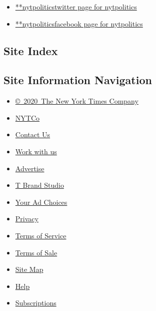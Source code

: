\begin{itemize}
\tightlist
\item
  \href{https://twitter.com/nytpolitics}{**nytpoliticstwitter page for
  nytpolitics}
\item
  \href{https://www.facebookcorewwwi.onion/nytpolitics}{**nytpoliticsfacebook
  page for nytpolitics}
\end{itemize}

\hypertarget{site-index}{%
\subsection{Site Index}\label{site-index}}

\hypertarget{site-information-navigation}{%
\subsection{Site Information
Navigation}\label{site-information-navigation}}

\begin{itemize}
\tightlist
\item
  \href{https://help.nytimes3xbfgragh.onion/hc/en-us/articles/115014792127-Copyright-notice}{©~2020~The
  New York Times Company}
\end{itemize}

\begin{itemize}
\tightlist
\item
  \href{https://www.nytco.com/}{NYTCo}
\item
  \href{https://help.nytimes3xbfgragh.onion/hc/en-us/articles/115015385887-Contact-Us}{Contact
  Us}
\item
  \href{https://www.nytco.com/careers/}{Work with us}
\item
  \href{https://nytmediakit.com/}{Advertise}
\item
  \href{http://www.tbrandstudio.com/}{T Brand Studio}
\item
  \href{https://www.nytimes3xbfgragh.onion/privacy/cookie-policy\#how-do-i-manage-trackers}{Your
  Ad Choices}
\item
  \href{https://www.nytimes3xbfgragh.onion/privacy}{Privacy}
\item
  \href{https://help.nytimes3xbfgragh.onion/hc/en-us/articles/115014893428-Terms-of-service}{Terms
  of Service}
\item
  \href{https://help.nytimes3xbfgragh.onion/hc/en-us/articles/115014893968-Terms-of-sale}{Terms
  of Sale}
\item
  \href{https://spiderbites.nytimes3xbfgragh.onion}{Site Map}
\item
  \href{https://help.nytimes3xbfgragh.onion/hc/en-us}{Help}
\item
  \href{https://www.nytimes3xbfgragh.onion/subscription?campaignId=37WXW}{Subscriptions}
\end{itemize}
